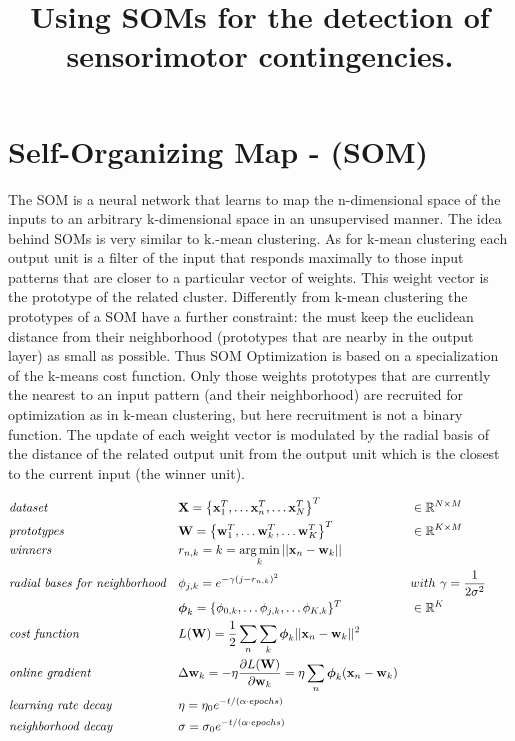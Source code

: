 \documentclass[a4paper]{article}
\title{Using SOMs for the detection of sensorimotor contingencies.}
\author{}
\DeclareMathOperator*{\argmin}{\operatorname*{arg\,min}} %
\begin{document}
\maketitle
\pagebreak
\section*{Self-Organizing Map - (SOM)}
The SOM is a neural network that learns to map the n-dimensional space of the inputs to an arbitrary k-dimensional space in an unsupervised manner. 
The idea behind SOMs is very similar to k.-mean clustering. As for k-mean clustering each output unit is a filter of the input that responds maximally to those input patterns that are closer to a particular vector of weights. This weight vector is the prototype of the related cluster. Differently from k-mean clustering the prototypes of a SOM have a further constraint: the must keep the euclidean distance from their neighborhood (prototypes that are nearby in the output layer) as small as possible.
Thus SOM Optimization is based on a specialization of the k-means cost function. Only those weights prototypes that are currently the nearest to an input pattern (and their neighborhood) are recruited for optimization as in k-mean clustering,  but here recruitment is not a binary function. The update of each weight vector is modulated by the radial basis of the distance of the related output unit from the output unit which is the closest to the current input (the winner unit).   


\begin{align}
	&\emph{dataset} && \mathbf{X}=\left\{\mathbf{x}^T_1,\dots\mathbf{x}^T_n,\dots\mathbf{x}^T_N\right\}^T &&\in\mathbb{R}^{N\times M} \nonumber\\
	&\emph{prototypes} && \mathbf{W}=\left\{\mathbf{w}^T_1,\dots\mathbf{w}^T_k,\dots\mathbf{w}^T_K\right\}^T &&\in\mathbb{R}^{K \times M} \nonumber\\
     &\emph{winners}&&  r_{n,k} = 
  k = \argmin_k ||\mathbf{x}_n - \mathbf{w}_k|| &&\nonumber\\
    &\emph{radial bases for neighborhood} && {\phi}_{j,k} = e^{{-\gamma (j-r_{n,k})^2}} && with\ \gamma=\frac{1}{2\sigma^2}\nonumber\\
    &&& \boldsymbol{\phi}_k = \{\phi_{0,k}, \dots\phi_{j,k}, \dots \phi_{K,k}\}^T && \in\mathbb{R}^{K}\nonumber\\
 	&\emph{cost function} && L(\mathbf{W}) = \frac{1}{2}\sum_n\sum_k \boldsymbol{\phi}_{k}||\mathbf{x}_n - \mathbf{w}_k||^2 &&   &&\nonumber\\
    &\emph{online gradient}&& \Delta{\mathbf{w}_{k}} = -\eta\frac{\partial L(\mathbf{W})}{\partial\mathbf{w}_k} = \eta\sum_{n}{\boldsymbol{\phi}_{k}(\mathbf{x}_{n} -\mathbf{w}_{k})} &&\nonumber\\
    &\emph{learning rate decay}&&  \eta = \eta_0e^{-t/(\alpha\cdot epochs)} &&\nonumber\\
    &\emph{neighborhood decay}&&  \sigma = \sigma_0e^{-t/(\alpha\cdot epochs)} &&\nonumber   
\end{align}
\end{document}

